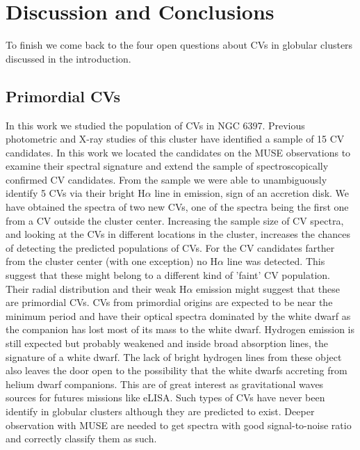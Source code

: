 \chapter{Discussion and Conclusions}\label{chap:conclu}
\thispagestyle{fancy}

To finish we come back to the four open questions about CVs in globular clusters discussed in the introduction. 


\section{Primordial CVs}

In this work we studied the population of CVs in NGC 6397. Previous photometric and X-ray studies of this cluster have identified a sample of 15 CV candidates. In this work we located the candidates on the MUSE observations to examine their spectral signature and extend the sample of spectroscopically confirmed CV candidates. From the sample we were able to unambiguously identify 5 CVs via their bright H$\alpha$ line in emission, sign of an accretion disk. We have obtained the spectra of two new CVs, one of the spectra being the first one from a CV outside the cluster center. Increasing the sample size of CV spectra, and looking at the CVs in different locations in the cluster, increases the chances of detecting the predicted populations of CVs. For the CV candidates farther from the cluster center (with one exception) no H$\alpha$ line was detected. This suggest that these might belong to a different kind of 'faint' CV population. Their radial distribution and their weak H$\alpha$ emission might suggest that these are primordial CVs. CVs from primordial origins are expected to be near the minimum period and have their optical spectra dominated by the white dwarf as the companion has lost most of its mass to the white dwarf. Hydrogen emission is still expected but probably weakened and inside broad absorption lines, the signature of a white dwarf. The lack of bright hydrogen lines from these object also leaves the door open to the possibility that the white dwarfs accreting from helium dwarf companions. This are of great interest as gravitational waves sources for futures missions like eLISA. Such types of CVs have never been identify in globular clusters although they are predicted to exist. Deeper observation with MUSE are needed to get spectra with good signal-to-noise ratio and correctly classify them as such. 

